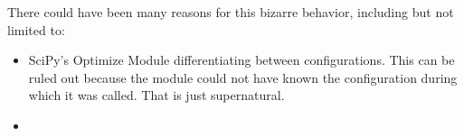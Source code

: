 \begin{appendices}
    There could have been many reasons for this bizarre behavior, including but not limited to:
    \begin{itemize}
        \item SciPy's Optimize Module differentiating between configurations. This can be ruled out because the module could not have known the configuration during which it was called. That is just supernatural.
        \item 
    \end{itemize}
\end{appendices}